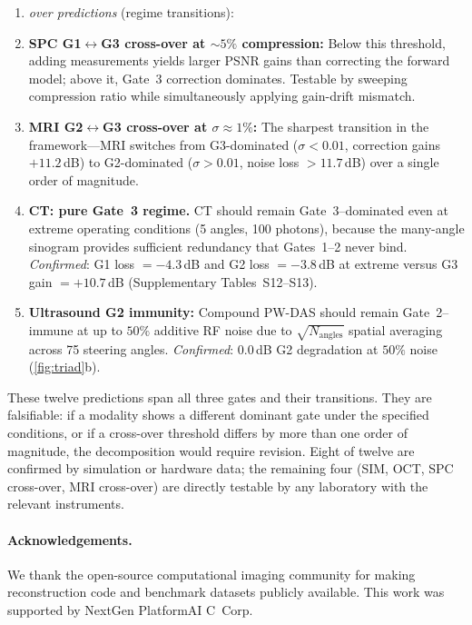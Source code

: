 \documentclass[11pt]{article}
\begin{document}
\begin{enumerate}
\item[\textit{Cross-}] \textit{over predictions} (regime transitions):
\item \textbf{SPC G1$\leftrightarrow$G3 cross-over at ${\sim}5\%$ compression:} Below this threshold, adding measurements yields larger PSNR gains than correcting the forward model; above it, Gate~3 correction dominates. Testable by sweeping compression ratio while simultaneously applying gain-drift mismatch.
\item \textbf{MRI G2$\leftrightarrow$G3 cross-over at $\sigma \approx 1\%$:} The sharpest transition in the framework---MRI switches from G3-dominated ($\sigma{<}0.01$, correction gains $+11.2$\,dB) to G2-dominated ($\sigma{>}0.01$, noise loss $>11.7$\,dB) over a single order of magnitude.
\item \textbf{CT: pure Gate~3 regime.} CT should remain Gate~3--dominated even at extreme operating conditions (5 angles, 100 photons), because the many-angle sinogram provides sufficient redundancy that Gates~1--2 never bind. \emph{Confirmed}: G1 loss $= -4.3$\,dB and G2 loss $= -3.8$\,dB at extreme versus G3 gain $= +10.7$\,dB (Supplementary Tables~S12--S13).
\item \textbf{Ultrasound G2 immunity:} Compound PW-DAS should remain Gate~2--immune at up to $50\%$ additive RF noise due to $\sqrt{N_{\mathrm{angles}}}$ spatial averaging across 75 steering angles. \emph{Confirmed}: $0.0$\,dB G2 degradation at $50\%$ noise (\cref{fig:triad}b).
\end{enumerate}
\noindent These twelve predictions span all three gates and their transitions. They are falsifiable: if a modality shows a different dominant gate under the specified conditions, or if a cross-over threshold differs by more than one order of magnitude, the decomposition would require revision. Eight of twelve are confirmed by simulation or hardware data; the remaining four (SIM, OCT, SPC cross-over, MRI cross-over) are directly testable by any laboratory with the relevant instruments.



\paragraph{Acknowledgements.}
We thank the open-source computational imaging community for making reconstruction code and benchmark datasets publicly available. This work was supported by NextGen PlatformAI C~Corp.
\end{document}
